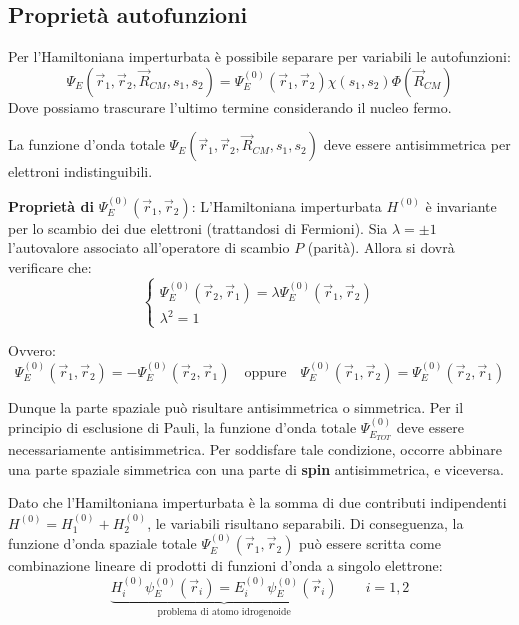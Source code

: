 \subsection{Proprietà autofunzioni}
Per l'Hamiltoniana imperturbata è possibile separare per variabili le autofunzioni:
\begin{equation}
    \Psi_E(\vec{r}_1, \vec{r}_2, \vec{R}_{CM}, s_1, s_2)= \Psi^{(0)}_E(\vec{r}_1, \vec{r}_2)\chi(s_1,s_2)   \Phi(\vec{R}_{CM})
\end{equation}
Dove possiamo trascurare l'ultimo termine considerando il nucleo fermo.

La funzione d'onda totale \(\Psi_E (\vec{r}_1, \vec{r}_2, \vec{R}_{CM}, s_1, s_2)\) deve essere antisimmetrica per elettroni indistinguibili.

\textbf{Proprietà di} \(\Psi_E^{(0)}(\vec{r}_1, \vec{r}_2)\):
L'Hamiltoniana imperturbata \(H^{(0)}\) è invariante per lo scambio dei due elettroni (trattandosi di Fermioni).
Sia \(\lambda = \pm 1\) l'autovalore associato all'operatore di scambio \(P \) (parità). Allora si dovrà verificare che:
\begin{equation}
    \begin{cases}
        \Psi_E^{(0)}(\vec{r}_2, \vec{r}_1) = \lambda \Psi_E^{(0)}(\vec{r}_1, \vec{r}_2) \\
        \lambda^2 = 1
    \end{cases}
\end{equation}

Ovvero:
\begin{equation}
    \Psi_E^{(0)}(\vec{r}_1, \vec{r}_2) = -\Psi_E^{(0)}(\vec{r}_2, \vec{r}_1) \quad \text{oppure} \quad \Psi_E^{(0)}(\vec{r}_1, \vec{r}_2) = \Psi_E^{(0)}(\vec{r}_2, \vec{r}_1)
\end{equation}

Dunque la parte spaziale può risultare antisimmetrica o simmetrica. Per il principio di esclusione di Pauli, la funzione d'onda totale \(\Psi_{E_{TOT}}^{(0)}\) deve essere necessariamente antisimmetrica. Per soddisfare tale condizione, occorre abbinare una parte spaziale simmetrica con una parte di \textbf{spin} antisimmetrica, e viceversa.

Dato che l'Hamiltoniana imperturbata è la somma di due contributi indipendenti \( H^{(0)} = H_1^{(0)} + H_2^{(0)} \), le variabili risultano separabili. Di conseguenza, la funzione d'onda spaziale totale \(\Psi_E^{(0)}(\vec{r}_1, \vec{r}_2)\) può essere scritta come combinazione lineare di prodotti di funzioni d'onda a singolo elettrone:
\begin{equation}
    \underbrace{H_i^{(0)} \psi_E^{(0)}(\vec{r}_i) = E_i^{(0)} \psi_E^{(0)}(\vec{r}_i)}_{\text{problema di atomo idrogenoide}} \qquad i=1,2
\end{equation}

